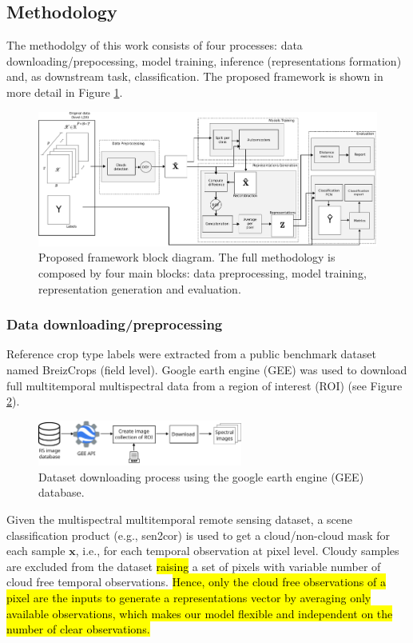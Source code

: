 \documentclass[journal,article,submit,pdftex,moreauthors]{Definitions/mdpi}
\begin{document}
\subsection{Methodology}
The methodolgy of this work consists of four processes: data downloading/prepocessing, model training, inference (representations formation) and, as downstream task, classification. The proposed framework is shown in more detail in Figure \ref{abstract}.
\begin{figure}[H]
	\centering
	\includegraphics[width=\textwidth]{figures/abstract.pdf}
	\caption{Proposed framework block diagram. The full methodology is composed by four main blocks: data preprocessing, model training, representation generation and evaluation.} 
	\label{abstract}
\end{figure}
\subsubsection{Data downloading/preprocessing}\label{data_preprocessing}
Reference crop type labels were extracted from a public benchmark dataset named BreizCrops \cite{Russwurm2020} (field level).
Google earth engine (GEE) was used to download full multitemporal multispectral data from a region of interest (ROI) (see Figure \ref{GEE_process}). \\
\begin{figure}[H]
	\centering
	\includegraphics[width=0.6\textwidth]{figures/gee_download.pdf}
	\caption{Dataset downloading process using the google earth engine (GEE) database.}
	\label{GEE_process}    
\end{figure}

Given the multispectral multitemporal remote sensing dataset, a scene classification product (e.g., sen2cor) is used to get a cloud/non-cloud mask for each sample $\mathbf{x}$, i.e., for each temporal observation at pixel level.
Cloudy samples are excluded from the dataset \hl{raising} a set of pixels with variable number of cloud free temporal observations. \hl{Hence, only the cloud free observations of a pixel are the inputs to generate a representations vector by averaging only available observations, which makes our model flexible and independent on the number of clear observations.}
\end{document}
